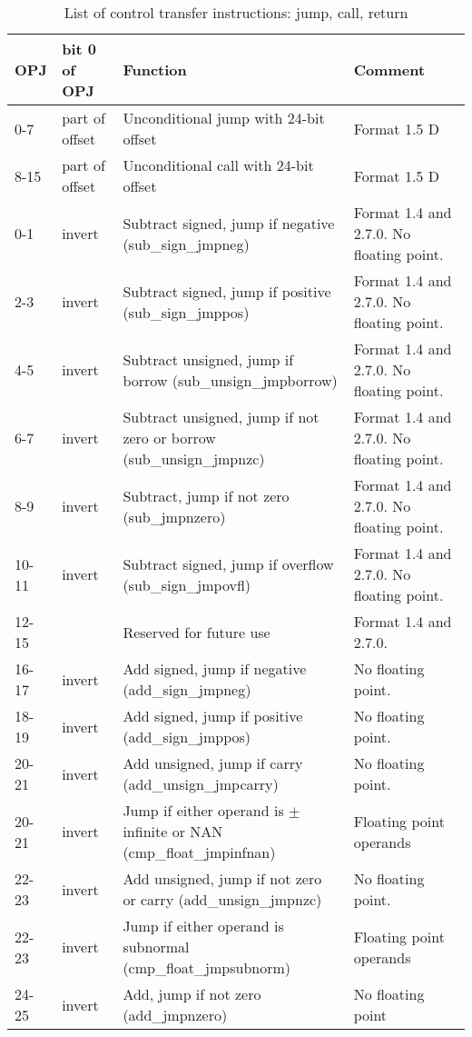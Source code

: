 \documentclass[forwardcom.tex]{subfiles}
\begin{document}
\begin{longtable}
{|p{10mm}|p{11mm}|p{50mm}|p{35mm}|}
\caption{List of control transfer instructions: jump, call, return}
\label{table:controlTransferInstructions}
\endfirsthead
\endhead
\hline
OPJ & bit 0 of OPJ & Function & Comment \\
\hline
0-7 & part of offset & Unconditional jump with 24-bit offset & Format 1.5 D \\
\hline
8-15 & part of offset & Unconditional call with 24-bit offset & Format 1.5 D \\
\hline
0-1 & invert & Subtract signed, jump if negative (sub\_sign\_jmpneg) & Format 1.4 and 
    2.7.0. No floating point. \\
\hline
2-3 & invert & Subtract signed, jump if positive (sub\_sign\_jmppos) & Format 1.4 and 2.7.0.
    No floating point. \\
\hline
4-5 & invert & Subtract unsigned, jump if borrow (sub\_unsign\_jmpborrow) & Format 1.4 and 2.7.0. No floating point. \\
\hline
6-7 & invert & Subtract unsigned, jump if not zero or borrow (sub\_unsign\_jmpnzc) & Format 1.4 and 2.7.0. No floating point. \\
\hline
8-9 & invert & Subtract, jump if not zero (sub\_jmpnzero) & Format 1.4 and 2.7.0. No floating point. \\
\hline
10-11 & invert & Subtract signed, jump if overflow (sub\_sign\_jmpovfl) & Format 1.4 and 2.7.0. No floating point. \\
\hline
12-15 & & Reserved for future use & Format 1.4 and 2.7.0. \\
\hline
16-17 & invert & Add signed, jump if negative (add\_sign\_jmpneg) & No floating point. \\
\hline
18-19 & invert & Add signed, jump if positive (add\_sign\_jmppos) & No floating point. \\
\hline
20-21 & invert & Add unsigned, jump if carry (add\_unsign\_jmpcarry) & No floating point. \\
\hline
20-21 & invert & Jump if either operand is $\pm$ infinite or NAN (cmp\_float\_jmpinfnan) & Floating point operands \\
\hline
22-23 & invert & Add unsigned, jump if not zero or carry (add\_unsign\_jmpnzc) & No floating point. \\
\hline
22-23 & invert & Jump if either operand is subnormal (cmp\_float\_jmpsubnorm) & Floating point operands \\
\hline
24-25 & invert & Add, jump if not zero (add\_jmpnzero) & No floating point \\

\end{longtable}
\end{document}
